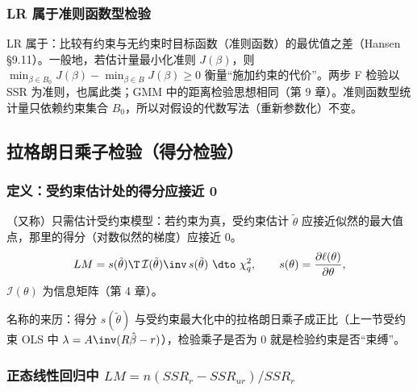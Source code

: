 \subsubsection{LR 属于准则函数型检验}

LR 属于：比较有约束与无约束时目标函数（准则函数）的最优值之差（Hansen §9.11）。一般地，若估计量最小化准则 $J(\beta)$，则 $\min_{\beta\in B_0}J(\beta)-\min_{\beta\in B}J(\beta)\ge0$ 衡量“施加约束的代价”。两步 F 检验以 SSR 为准则，也属此类；GMM 中的距离检验思想相同（第 9 章）。准则函数型统计量只依赖约束集合 $B_0$，所以对假设的代数写法（重新参数化）不变。

\subsection{拉格朗日乘子检验（得分检验）}

\subsubsection{定义：受约束估计处的得分应接近 0}

\begin{defn}[拉格朗日乘子检验]\label{def:U06b-LM}
（又称）只需估计受约束模型：若约束为真，受约束估计 $\tilde\theta$ 应接近似然的最大值点，那里的得分（对数似然的梯度）应接近 0。
\[
LM=s(\tilde\theta)\T\,\mathcal I(\tilde\theta)\inv\,s(\tilde\theta)\ \dto\ \chi^2_q,\qquad s(\theta)=\frac{\partial\ell(\theta)}{\partial\theta},
\]
$\mathcal I(\theta)$ 为信息矩阵（第 4 章）。
\end{defn}
名称的来历：得分 $s(\tilde\theta)$ 与受约束最大化中的拉格朗日乘子成正比（上一节受约束 OLS 中 $\lambda=A\inv(R\hat\beta-r)$），检验乘子是否为 0 就是检验约束是否“束缚”。

\subsubsection{正态线性回归中 \texorpdfstring{$LM=n(SSR_r-SSR_{ur})/SSR_r$}{LM = n(SSR_r - SSR_ur)/SSR_r}}

